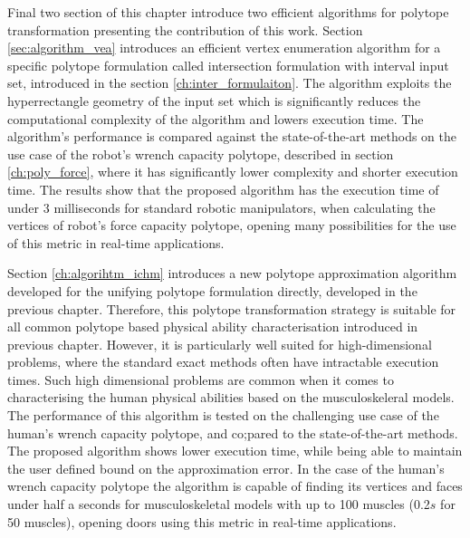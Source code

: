 Final two section of this chapter introduce two efficient algorithms for polytope transformation presenting the contribution of this work. Section \ref{sec:algorithm_vea} introduces an efficient vertex enumeration algorithm for a specific polytope formulation called intersection formulation with interval input set, introduced in the section \ref{ch:inter_formulaiton}. The algorithm exploits the hyperrectangle geometry of the input set which is significantly reduces the computational complexity of the algorithm and lowers execution time. The algorithm's performance is compared against the state-of-the-art methods on the use case of the robot's wrench capacity polytope, described in section \ref{ch:poly_force}, where it has significantly lower complexity and shorter execution time. The results show that the proposed algorithm has the execution time of under 3 milliseconds for standard robotic manipulators, when calculating the vertices of robot's force capacity polytope, opening many possibilities for the use of this metric in real-time applications. 

Section \ref{ch:algorihtm_ichm} introduces a new polytope approximation algorithm developed for the unifying polytope formulation directly, developed in the previous chapter. Therefore, this polytope transformation strategy is suitable for all common polytope based physical ability characterisation introduced in previous chapter. However, it is particularly well suited for high-dimensional problems, where the standard exact methods often have intractable execution times. Such high dimensional problems are common when it comes to characterising the human physical abilities based on the musculoskeleral models. The performance of this algorithm is tested on the challenging use case of the human's wrench capacity polytope, and co;pared to the state-of-the-art methods. The proposed algorithm shows lower execution time, while being able to maintain the user defined bound on the approximation error. In the case of the human's wrench capacity polytope the algorithm is capable of finding its vertices and faces under half a seconds for musculoskeletal models with up to 100 muscles (0.2$s$ for 50 muscles), opening doors using this metric in real-time applications.



